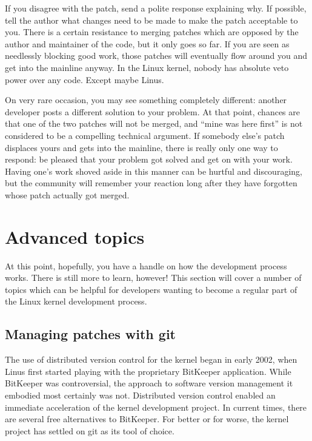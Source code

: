 \documentclass[a4paper,8pt,english]{sphinxmanual}
\begin{document}
If you disagree with the patch, send a polite response explaining why.  If
possible, tell the author what changes need to be made to make the patch
acceptable to you.  There is a certain resistance to merging patches which
are opposed by the author and maintainer of the code, but it only goes so
far.  If you are seen as needlessly blocking good work, those patches will
eventually flow around you and get into the mainline anyway.  In the Linux
kernel, nobody has absolute veto power over any code.  Except maybe Linus.

On very rare occasion, you may see something completely different: another
developer posts a different solution to your problem.  At that point,
chances are that one of the two patches will not be merged, and ``mine was
here first'' is not considered to be a compelling technical argument.  If
somebody else's patch displaces yours and gets into the mainline, there is
really only one way to respond: be pleased that your problem got solved and
get on with your work.  Having one's work shoved aside in this manner can
be hurtful and discouraging, but the community will remember your reaction
long after they have forgotten whose patch actually got merged.


\section{Advanced topics}
\label{process/7.AdvancedTopics:development-advancedtopics}\label{process/7.AdvancedTopics:advanced-topics}\label{process/7.AdvancedTopics::doc}
At this point, hopefully, you have a handle on how the development process
works.  There is still more to learn, however!  This section will cover a
number of topics which can be helpful for developers wanting to become a
regular part of the Linux kernel development process.


\subsection{Managing patches with git}
\label{process/7.AdvancedTopics:managing-patches-with-git}
The use of distributed version control for the kernel began in early 2002,
when Linus first started playing with the proprietary BitKeeper
application.  While BitKeeper was controversial, the approach to software
version management it embodied most certainly was not.  Distributed version
control enabled an immediate acceleration of the kernel development
project.  In current times, there are several free alternatives to
BitKeeper.  For better or for worse, the kernel project has settled on git
as its tool of choice.
\end{document}
